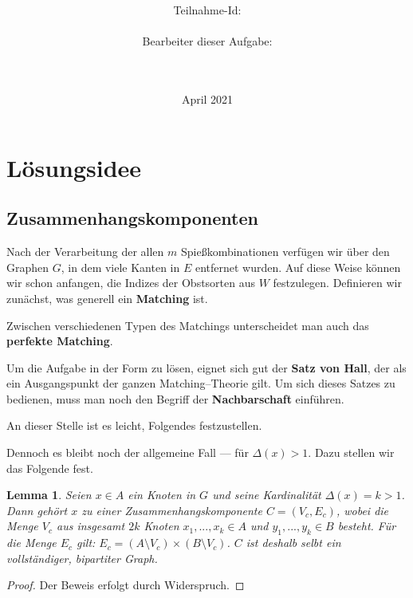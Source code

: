 \documentclass[a4paper,10pt,ngerman]{scrartcl}
\title{\textbf{\Huge\Aufgabe}}
\author{\LARGE Teilnahme-Id: \LARGE \TeilnahmeId \\\\
	    \LARGE Bearbeiter dieser Aufgabe: \\ 
	    \LARGE \Namen\\\\}
\date{\LARGE April 2021}
\newtheorem{lemma}{Lemma}
\newcommand{\TODO}[1]{\todo[inline]{TODO: #1}}
\newcommand{\tbf}[1]{\textbf{#1}}
\begin{document}
\maketitle
\tableofcontents

\section{Lösungsidee}






\subsection{Zusammenhangskomponenten}
Nach der Verarbeitung der allen $m$ Spießkombinationen verfügen wir über den Graphen $G$,
in dem viele Kanten in $E$ entfernet wurden.
Auf diese Weise können wir schon anfangen, die Indizes der Obstsorten aus $W$ festzulegen.
Definieren wir zunächst, was generell ein \tbf{Matching} ist.



\noindent
Zwischen verschiedenen Typen des Matchings unterscheidet man auch das \tbf{perfekte Matching}.



\noindent
Um die Aufgabe in der Form zu lösen, eignet sich gut der \tbf{Satz von Hall},
der als ein Ausgangspunkt der ganzen Matching--Theorie gilt. 
Um sich dieses Satzes zu bedienen, muss man noch den Begriff der \tbf{Nachbarschaft} einführen.





An dieser Stelle ist es leicht, Folgendes festzustellen.



Dennoch es bleibt noch der allgemeine Fall --- für $\Delta(x) > 1$.
Dazu stellen wir das Folgende fest.

\begin{lemma}\label{lem:grad-groesser1}
Seien $x \in A$ ein Knoten in $G$ und seine Kardinalität $\Delta(x) = k > 1$.
Dann gehört $x$ zu einer Zusammenhangskomponente $C = (V_c, E_c)$, wobei
die Menge $V_c$ aus insgesamt $2k$ Knoten $x_1, ..., x_k \in A$ 
und $y_1, ..., y_k \in B$ besteht. Für die Menge $E_c$ gilt:
$E_c = (A \setminus V_c) \times (B \setminus V_c) $.
$C$ ist deshalb selbt ein vollständiger, bipartiter Graph.
\end{lemma}
\begin{proof}
Der Beweis erfolgt durch Widerspruch.
\TODO{Beweis} 
\end{proof}
\end{document}
